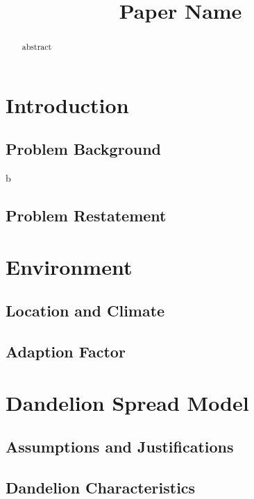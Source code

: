 \documentclass[12pt]{article}
\title{Paper Name}  %
\begin{document}
\begin{abstract}

	abstract

\end{abstract}

\maketitle
\tableofcontents





\section{Introduction}

	\subsection{Problem Background}
	
	b
	
	\subsection{Problem Restatement}

\section{Environment}

	\subsection{Location and Climate}
	
	\subsection{Adaption Factor}

\section{Dandelion Spread Model}

	\subsection{Assumptions and Justifications}

	\subsection{Dandelion Characteristics}
	
\end{document}
